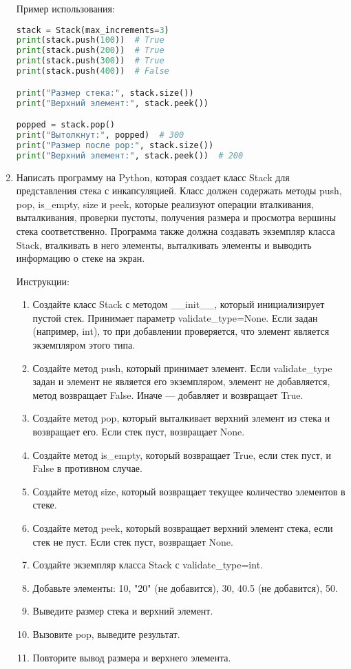\begin{enumerate}
Пример использования:
\begin{lstlisting}[language=Python]
stack = Stack(max_increments=3)
print(stack.push(100))  # True
print(stack.push(200))  # True
print(stack.push(300))  # True
print(stack.push(400))  # False

print("Размер стека:", stack.size())
print("Верхний элемент:", stack.peek())

popped = stack.pop()
print("Вытолкнут:", popped)  # 300
print("Размер после pop:", stack.size())
print("Верхний элемент:", stack.peek())  # 200
\end{lstlisting}

\item Написать программу на Python, которая создает класс Stack для представления стека с инкапсуляцией. Класс должен содержать методы push, pop, is\_empty, size и peek, которые реализуют операции вталкивания, выталкивания, проверки пустоты, получения размера и просмотра вершины стека соответственно. Программа также должна создавать экземпляр класса Stack, вталкивать в него элементы, выталкивать элементы и выводить информацию о стеке на экран.

Инструкции:
\begin{enumerate}
    \item Создайте класс Stack с методом \_\_init\_\_, который инициализирует пустой стек. Принимает параметр validate\_type=None. Если задан (например, int), то при добавлении проверяется, что элемент является экземпляром этого типа.
    \item Создайте метод push, который принимает элемент. Если validate\_type задан и элемент не является его экземпляром, элемент не добавляется, метод возвращает False. Иначе — добавляет и возвращает True.
    \item Создайте метод pop, который выталкивает верхний элемент из стека и возвращает его. Если стек пуст, возвращает None.
    \item Создайте метод is\_empty, который возвращает True, если стек пуст, и False в противном случае.
    \item Создайте метод size, который возвращает текущее количество элементов в стеке.
    \item Создайте метод peek, который возвращает верхний элемент стека, если стек не пуст. Если стек пуст, возвращает None.
    \item Создайте экземпляр класса Stack с validate\_type=int.
    \item Добавьте элементы: 10, "20" (не добавится), 30, 40.5 (не добавится), 50.
    \item Выведите размер стека и верхний элемент.
    \item Вызовите pop, выведите результат.
    \item Повторите вывод размера и верхнего элемента.
\end{enumerate}


\end{enumerate}

